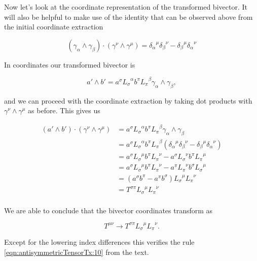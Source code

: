 Now let's look at the coordinate representation of the transformed bivector.  It will also be helpful to make use of the identity that can be observed above from the initial coordinate extraction

\begin{equation}\label{eqn:antisymmetricTensorTx:90}
(\gamma_\alpha \wedge \gamma_\beta) \cdot (\gamma^\nu \wedge \gamma^\mu) = {\delta_\alpha}^\mu {\delta_\beta}^\nu -{\delta_\beta}^\mu {\delta_\alpha}^\nu 
\end{equation}

In coordinates our transformed bivector is

\begin{equation}\label{eqn:antisymmetricTensorTx:100}
a' \wedge b' =
a^\sigma {L_\sigma}^\alpha
b^\pi {L_\pi}^\beta
\gamma_\alpha \wedge \gamma_\beta,
\end{equation}

and we can proceed with the coordinate extraction by taking dot products with $\gamma^\nu \wedge \gamma^\mu$ as before.  This gives us

\begin{align*}
( a' \wedge b' ) \cdot (\gamma^\nu \wedge \gamma^\mu)
&=
a^\sigma {L_\sigma}^\alpha
b^\pi {L_\pi}^\beta
\gamma_\alpha \wedge \gamma_\beta \\
&=
a^\sigma {L_\sigma}^\alpha
b^\pi {L_\pi}^\beta
( {\delta_\alpha}^\mu {\delta_\beta}^\nu -{\delta_\beta}^\mu {\delta_\alpha}^\nu  ) \\
&=
a^\sigma {L_\sigma}^\mu
b^\pi {L_\pi}^\nu
-
a^\sigma {L_\sigma}^\nu
b^\pi {L_\pi}^\mu \\
&=
a^\sigma {L_\sigma}^\mu
b^\pi {L_\pi}^\nu
-
a^\pi {L_\pi}^\nu
b^\sigma {L_\sigma}^\mu \\
&=
(a^\sigma b^\pi - a^\pi b^\sigma) {L_\sigma}^\mu {L_\pi}^\nu
\\
&=
T^{\sigma \pi} {L_\sigma}^\mu {L_\pi}^\nu
\\
\end{align*}

We are able to conclude that the bivector coordinates transform as

\begin{equation}\label{eqn:antisymmetricTensorTx:200}
T^{\mu \nu} \rightarrow T^{\sigma \pi} {L_\sigma}^\mu {L_\pi}^\nu.
\end{equation}

Except for the lowering index differences this verifies the rule \ref{eqn:antisymmetricTensorTx:10} from the text.

